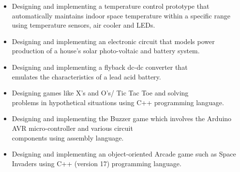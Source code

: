 \documentclass[10pt,a4paper,ragged2e]{altacv}
\begin{document}






\begin{itemize}
    \item Designing and implementing a temperature control prototype that automatically maintains indoor space temperature within a specific range using temperature sensors, air cooler and LEDs.
    \item Designing and implementing an electronic circuit that models power production of a house's solar photo-voltaic and battery system.
    \item Designing and implementing a flyback dc-dc converter that\\ emulates the characteristics of a lead acid battery.
\end{itemize}


\begin{itemize}
    \item Designing games like X’s and O’s/ Tic Tac Toe and solving \\ problems in hypothetical situations using C++ programming language.
    \item Designing and implementing the Buzzer game which involves the Arduino AVR micro-controller and various circuit\\ components using assembly language.
    \item Designing and implementing an object-oriented Arcade game such as Space Invaders using C++ (version 17) programming language.
\end{itemize}

\nocite{*}



\end{document}
